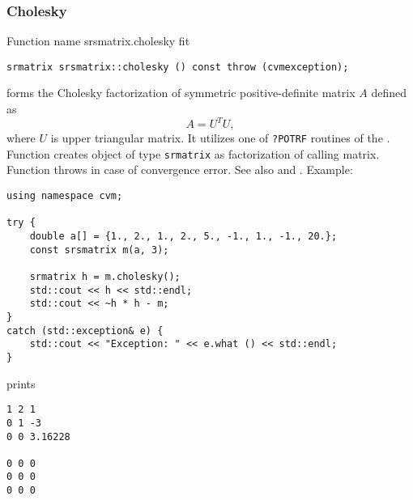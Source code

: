 \subsubsection{Cholesky}
Function%
\pdfdest name {srsmatrix.cholesky} fit
\begin{verbatim}
srmatrix srsmatrix::cholesky () const throw (cvmexception);
\end{verbatim}
forms the Cholesky factorization of  symmetric positive-definite 
matrix $A$ defined as
\begin{equation*}
A=U^T U,
\end{equation*}
where $U$ is upper triangular matrix.
It utilizes one of \verb"?POTRF" routines of the
.
Function
creates  object of type \verb"srmatrix" as 
 factorization of  calling matrix.
Function
throws 
in case of convergence error.
See also
 and
.
Example:
\begin{Verbatim}
using namespace cvm;

try {
    double a[] = {1., 2., 1., 2., 5., -1., 1., -1., 20.};
    const srsmatrix m(a, 3);
    
    srmatrix h = m.cholesky();
    std::cout << h << std::endl;
    std::cout << ~h * h - m;
}
catch (std::exception& e) {
    std::cout << "Exception: " << e.what () << std::endl;
}
\end{Verbatim}
prints
\begin{Verbatim}
1 2 1
0 1 -3
0 0 3.16228

0 0 0
0 0 0
0 0 0
\end{Verbatim}
\newpage



